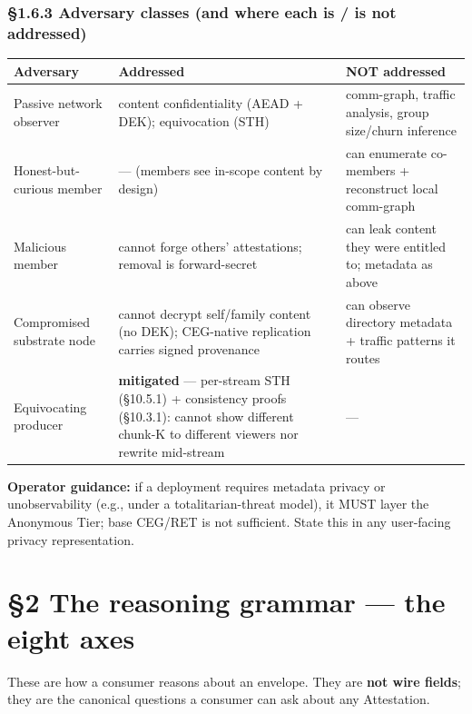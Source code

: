 \documentclass[11pt]{article}
\begin{document}
\subsubsection*{§1.6.3 Adversary classes (and where each is / is not addressed)}

{\footnotesize
\begin{longtable}{|p{5.33cm}|p{5.33cm}|p{5.33cm}|}\hline
\textbf{Adversary} & \textbf{Addressed} & \textbf{NOT addressed} \\ \hline\endhead
Passive network observer & content confidentiality (AEAD + DEK); equivocation (STH) & comm-graph, traffic analysis, group size/churn inference \\ \hline
Honest-but-curious member & — (members see in-scope content by design) & can enumerate co-members + reconstruct local comm-graph \\ \hline
Malicious member & cannot forge others' attestations; removal is forward-secret & can leak content they were entitled to; metadata as above \\ \hline
Compromised substrate node & cannot decrypt self/family content (no DEK); CEG-native replication carries signed provenance & can observe directory metadata + traffic patterns it routes \\ \hline
Equivocating producer & \textbf{mitigated} — per-stream STH (§10.5.1) + consistency proofs (§10.3.1): cannot show different chunk-K to different viewers nor rewrite mid-stream & — \\ \hline
\end{longtable}}


\textbf{Operator guidance:} if a deployment requires metadata privacy or unobservability (e.g., under a totalitarian-threat model), it MUST layer the Anonymous Tier; base CEG/RET is not sufficient. State this in any user-facing privacy representation.




\clearpage


\section*{§2 The reasoning grammar — the eight axes}


These are how a consumer reasons about an envelope. They are \textbf{not wire fields}; they are the canonical questions a consumer can ask about any Attestation.
\end{document}
